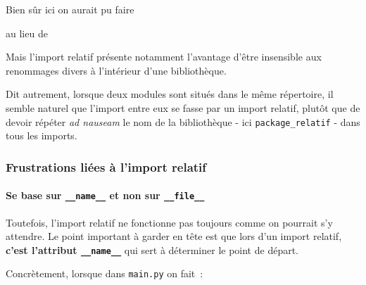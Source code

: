     Bien sûr ici on aurait pu faire

\begin{Shaded}
\begin{Highlighting}[frame=lines,framerule=0.6mm,rulecolor=\color{asisframecolor}]
\end{Highlighting}
\end{Shaded}

au lieu de

\begin{Shaded}
\begin{Highlighting}[frame=lines,framerule=0.6mm,rulecolor=\color{asisframecolor}]
\end{Highlighting}
\end{Shaded}

    Mais l'import relatif présente notamment l'avantage d'être insensible
aux renommages divers à l'intérieur d'une bibliothèque.

    Dit autrement, lorsque deux modules sont situés dans le même répertoire,
il semble naturel que l'import entre eux se fasse par un import relatif,
plutôt que de devoir répéter \emph{ad nauseam} le nom de la bibliothèque
- ici \texttt{package\_relatif} - dans tous les imports.

    \hypertarget{frustrations-liuxe9es-uxe0-limport-relatif}{%
\subsubsection{Frustrations liées à l'import
relatif}\label{frustrations-liuxe9es-uxe0-limport-relatif}}

    \hypertarget{se-base-sur-__name__-et-non-sur-__file__}{%
\paragraph{\texorpdfstring{Se base sur \texttt{\_\_name\_\_} et non sur
\texttt{\_\_file\_\_}}{Se base sur \_\_name\_\_ et non sur \_\_file\_\_}}\label{se-base-sur-__name__-et-non-sur-__file__}}

    Toutefois, l'import relatif ne fonctionne pas toujours comme on pourrait
s'y attendre. Le point important à garder en tête est que lors d'un
import relatif, \textbf{c'est l'attribut \texttt{\_\_name\_\_}} qui sert
à déterminer le point de départ.

    Concrètement, lorsque dans \texttt{main.py} on fait~:

